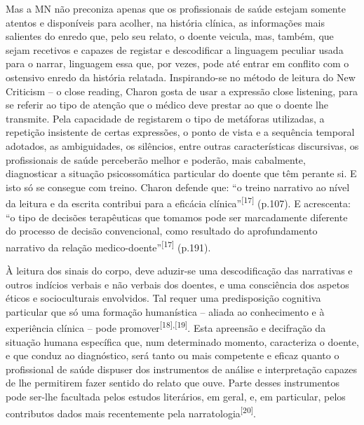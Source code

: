 \documentclass{article}
\begin{document}
Mas a MN não preconiza apenas que os profissionais de saúde estejam somente
atentos e disponíveis para acolher, na história clínica, as informações mais
salientes do enredo que, pelo seu relato, o doente veicula, mas, também, que
sejam recetivos e capazes de registar e descodificar a linguagem peculiar usada
para o narrar, linguagem essa que, por vezes, pode até entrar em conflito com o
ostensivo enredo da história relatada. Inspirando-se no método de leitura do New
Criticism – o close reading, Charon gosta de usar a expressão close listening,
para se referir ao tipo de atenção que o médico deve prestar ao que o doente lhe
transmite. Pela capacidade de registarem o tipo de metáforas utilizadas, a
repetição insistente de certas expressões, o ponto de vista e a sequência
temporal adotados, as ambiguidades, os silêncios, entre outras características
discursivas, os profissionais de saúde perceberão melhor e poderão, mais
cabalmente, diagnosticar a situação psicossomática particular do doente que têm
perante si. E isto só se consegue com treino. Charon defende que: “o treino
narrativo ao nível da leitura e da escrita contribui para a eficácia
clínica”\textsuperscript{[}\textsuperscript{17}\textsuperscript{]}
(p.107). E acrescenta: “o tipo de decisões terapêuticas que tomamos pode ser
marcadamente diferente do processo de decisão convencional, como resultado do
aprofundamento narrativo da relação
medico-doente”\textsuperscript{[}\textsuperscript{17}\textsuperscript{]}
(p.191).

À leitura dos sinais do corpo, deve aduzir-se uma descodificação das narrativas
e outros indícios verbais e não verbais dos doentes, e uma consciência dos
aspetos éticos e socioculturais envolvidos. Tal requer uma predisposição
cognitiva particular que só uma formação humanística – aliada ao conhecimento e
à experiência clínica – pode promover\textsuperscript{[}\textsuperscript{18}\textsuperscript{]}\textsuperscript{,}\textsuperscript{[}\textsuperscript{19}\textsuperscript{]}. Esta apreensão e decifração da situação humana específica que, num determinado
momento, caracteriza o doente, e que conduz ao diagnóstico, será tanto ou mais
competente e eficaz quanto o profissional de saúde dispuser dos instrumentos de
análise e interpretação capazes de lhe permitirem fazer sentido do relato que
ouve. Parte desses instrumentos pode ser-lhe facultada pelos estudos literários,
em geral, e, em particular, pelos contributos dados mais recentemente pela
narratologia\textsuperscript{[}\textsuperscript{20}\textsuperscript{]}.
\end{document}
